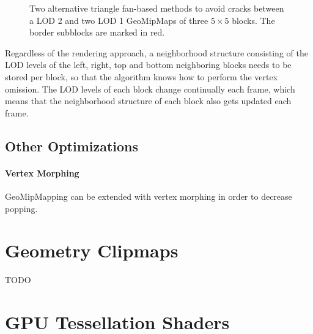 \begin{figure}[H]
  \centering
  \qquad
  \caption{Two alternative triangle fan-based methods to avoid cracks between a LOD 2 and two LOD 1 GeoMipMaps of three $5 \times 5$ blocks. The border subblocks are marked in red.}\label{fig:geomipmapping-crack-avoidance-alternative}
\end{figure}

Regardless of the rendering approach, a neighborhood structure consisting of the LOD levels of the left, right, top and bottom 
neighboring blocks needs to be stored per block, so that the algorithm knows how to perform the vertex omission. The LOD levels of each block change continually each frame, which means 
that the neighborhood structure of each block also gets updated each frame.

\subsection{Other Optimizations}
\paragraph{Vertex Morphing}
GeoMipMapping can be extended with vertex morphing in order to decrease popping.




\section{Geometry Clipmaps}
TODO


\section{GPU Tessellation Shaders}

